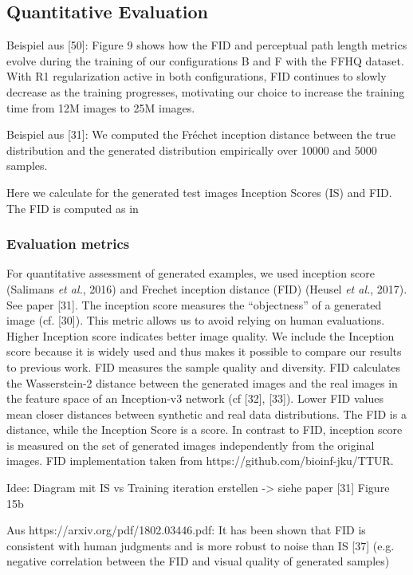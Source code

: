 \documentclass[12pt,a4paper]{article}
\begin{document}
\subsection{Quantitative Evaluation}
Beispiel aus [50]: Figure 9 shows how the FID and perceptual path length metrics evolve during the training of our configurations B and F with the FFHQ dataset. With R1 regularization active in both configurations, FID continues to slowly decrease as the training progresses, motivating our choice to increase the training time from 12M images to 25M images.

Beispiel aus [31]: We computed the Fréchet inception distance between the true distribution and the generated
distribution empirically over 10000 and 5000 samples.

Here we calculate for the generated test images Inception Scores (IS) and FID. The FID is computed as in 
\subsubsection{Evaluation metrics}
For quantitative assessment of generated examples, we used inception score (Salimans \textit{et al.}, 2016)
and Frechet inception distance (FID) (Heusel \textit{et al.}, 2017). See paper [31]. The inception score measures the “objectness” of a generated image (cf. [30]). This metric allows us to avoid relying on human evaluations. Higher Inception score indicates better image quality. We include the Inception score because it is widely used and thus makes it possible to compare our results to previous work. FID measures the sample quality and diversity. FID calculates the Wasserstein-2 distance between the generated images and the real images in the feature space of an Inception-v3 network (cf [32], [33]). Lower FID values mean closer distances between synthetic and real data distributions. The FID is a distance, while the Inception Score is a score. In contrast to FID, inception score is
measured on the set of generated images independently from the original images.
FID implementation taken from https://github.com/bioinf-jku/TTUR.

Idee: Diagram mit IS vs Training iteration erstellen -> siehe paper [31] Figure 15b

Aus https://arxiv.org/pdf/1802.03446.pdf: It has been shown that FID is consistent with human judgments and is more robust to noise than IS [37] (e.g. negative correlation between the FID and visual quality of generated samples)
\end{document}
